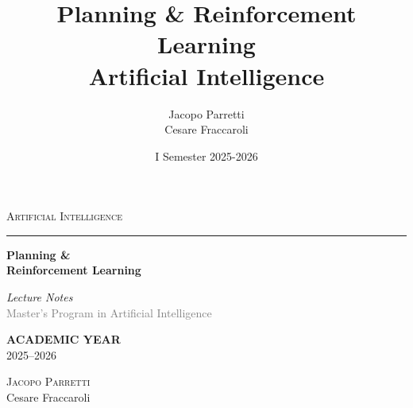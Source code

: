 \documentclass[11pt,a4paper]{article}
\title{\textbf{Planning \& Reinforcement Learning}\\
\large Artificial Intelligence}
\author{Jacopo Parretti \\ Cesare Fraccaroli}
\date{I Semester 2025-2026}
\theoremstyle{definition}
\theoremstyle{plain}
\theoremstyle{remark}
\begin{document}
\begin{titlepage}
    \begin{center}
        \vspace*{2cm}
        
        {\large\textsc{Artificial Intelligence}}
        
        \vspace{0.4cm}
        \textcolor{blue!60!black}{\rule{0.5\textwidth}{1pt}}
        
        \vspace{2.5cm}
        
        {\fontsize{36}{44}\selectfont\bfseries Planning \&\\[0.5cm] Reinforcement Learning}
        
        \vspace{1.5cm}
        
        \begin{tcolorbox}[
            colback=blue!3!white,
            colframe=blue!40!black,
            width=0.6\textwidth,
            arc=1mm,
            boxrule=0.8pt,
            left=15pt,
            right=15pt,
            top=10pt,
            bottom=10pt
        ]
            \centering
            {\large\textit{Lecture Notes}}\\[0.3cm]
            \textcolor{gray}{Master's Program in Artificial Intelligence}
        \end{tcolorbox}
        
        \vfill
        
        \begin{tcolorbox}[
            enhanced,
            colback=white,
            colframe=gray!30,
            width=0.5\textwidth,
            arc=0mm,
            boxrule=0.5pt,
            left=20pt,
            right=20pt,
            top=12pt,
            bottom=12pt,
            shadow={2mm}{-2mm}{0mm}{black!10}
        ]
            \centering
            {\small\textcolor{gray!70}{\textbf{ACADEMIC YEAR}}}\\[0.4cm]
            {\Large 2025--2026}
        \end{tcolorbox}
        
        \vspace{2cm}
        
        {\LARGE\textsc{Jacopo Parretti}\\[0.3cm]Cesare Fraccaroli}
        
        \vspace{1.5cm}
        
    \end{center}
\end{titlepage}
\end{document}
